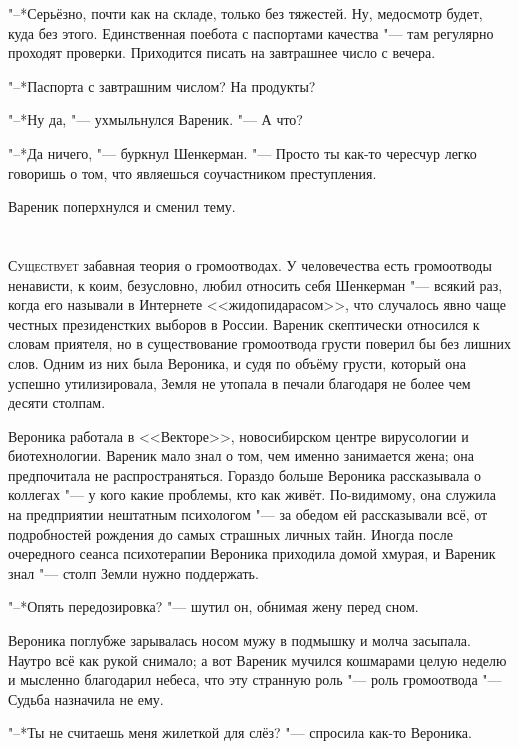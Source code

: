 "--*Серьёзно, почти как на складе, только без тяжестей.
Ну, медосмотр будет, куда без этого.
Единственная поебота с паспортами качества "--- там регулярно проходят проверки.
Приходится писать на завтрашнее число с вечера.

"--*Паспорта с завтрашним числом?
На продукты?

"--*Ну да, "--- ухмыльнулся Вареник.
"--- А что?

"--*Да ничего, "--- буркнул Шенкерман.
"--- Просто ты как-то чересчур легко говоришь о том, что являешься соучастником преступления.

Вареник поперхнулся и сменил тему.

\chapter{}

\lettrine[lines=4,slope=0pt,nindent=3pt]{С}{уществует} забавная теория о громоотводах.
У человечества есть громоотводы ненависти, к коим, безусловно, любил относить себя Шенкерман "--- всякий раз, когда его называли в Интернете <<жидопидарасом>>, что случалось явно чаще честных президенстких выборов в России.
Вареник скептически относился к словам приятеля, но в существование громоотвода грусти поверил бы без лишних слов.
Одним из них была Вероника, и судя по объёму грусти, который она успешно утилизировала, Земля не утопала в печали благодаря не более чем десяти столпам.

Вероника работала в <<Векторе>>, новосибирском центре вирусологии и биотехнологии.
Вареник мало знал о том, чем именно занимается жена;
она предпочитала не распространяться.
Гораздо больше Вероника рассказывала о коллегах "--- у кого какие проблемы, кто как живёт.
По-видимому, она служила на предприятии нештатным психологом "--- за обедом ей рассказывали всё, от подробностей рождения до самых страшных личных тайн.
Иногда после очередного сеанса психотерапии Вероника приходила домой хмурая, и Вареник знал "--- столп Земли нужно поддержать.

"--*Опять передозировка? "--- шутил он, обнимая жену перед сном.

Вероника поглубже зарывалась носом мужу в подмышку и молча засыпала.
Наутро всё как рукой снимало;
а вот Вареник мучился кошмарами целую неделю и мысленно благодарил небеса, что эту странную роль "--- роль громоотвода "--- Судьба назначила не ему.

"--*Ты не считаешь меня жилеткой для слёз? "--- спросила как-то Вероника.

